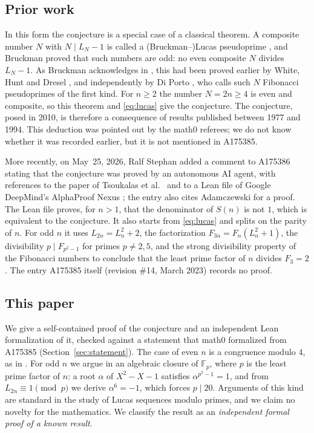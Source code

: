 \documentclass[11pt]{amsart}
\theoremstyle{plain}
\theoremstyle{definition}
\newcommand{\F}{\mathbb{F}}
\begin{document}
\subsection*{Prior work}
In this form the conjecture is a special case of a classical theorem.
A composite number $N$ with $N\mid L_N-1$ is called a (Bruckman--)Lucas pseudoprime \cite{A005845}, and Bruckman \cite{Br} proved that such numbers are odd: no even composite $N$ divides $L_N-1$.
As Bruckman acknowledges in \cite{Br}, this had been proved earlier by White, Hunt and Dresel \cite{WHD}, and independently by Di Porto \cite{DP}, who calls such $N$ Fibonacci pseudoprimes of the first kind.
For $n\ge2$ the number $N=2n\ge4$ is even and composite, so this theorem and \eqref{eq:lucas} give the conjecture.
The conjecture, posed in 2010, is therefore a consequence of results published between 1977 and 1994.
This deduction was pointed out by the math0 referees; we do not know whether it was recorded earlier, but it is not mentioned in A175385.

More recently, on May~25, 2026, Ralf Stephan added a comment to A175386 \cite{A175386} stating that the conjecture was proved by an autonomous AI agent, with references to the paper of Tsoukalas et al.\ \cite{Ts} and to a Lean file of Google DeepMind's AlphaProof Nexus \cite{APN}; the entry also cites Adamczewski \cite[p.~15, Appendix~A]{Ad} for a proof.
The Lean file proves, for $n>1$, that the denominator of $S(n)$ is not $1$, which is equivalent to the conjecture.
It also starts from \eqref{eq:lucas} and splits on the parity of $n$.
For odd $n$ it uses $L_{2n}=L_n^2+2$, the factorization $F_{3n}=F_n(L_n^2+1)$, the divisibility $p\mid F_{p^2-1}$ for primes $p\ne2,5$, and the strong divisibility property of the Fibonacci numbers to conclude that the least prime factor of $n$ divides $F_3=2$.
The entry A175385 itself (revision \#14, March 2023) records no proof.

\subsection*{This paper}
We give a self-contained proof of the conjecture and an independent Lean formalization of it, checked against a statement that math0 formalized from A175385 (Section~\ref{sec:statement}).
The case of even $n$ is a congruence modulo $4$, as in \cite{APN}.
For odd $n$ we argue in an algebraic closure of $\F_p$, where $p$ is the least prime factor of $n$: a root $\alpha$ of $X^2-X-1$ satisfies $\alpha^{p^2-1}=1$, and from $L_{2n}\equiv1\pmod p$ we derive $\alpha^6=-1$, which forces $p\mid 20$.
Arguments of this kind are standard in the study of Lucas sequences modulo primes, and we claim no novelty for the mathematics.
We classify the result as an \emph{independent formal proof of a known result}.
\end{document}
